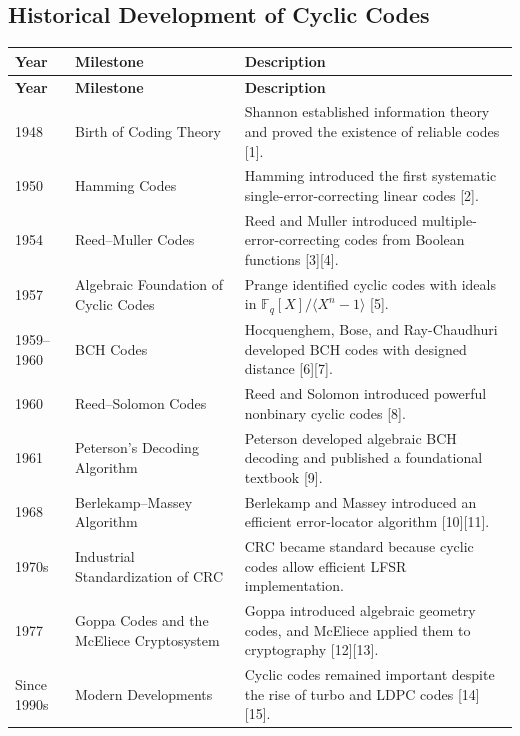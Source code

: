 \subsection{Historical Development of Cyclic Codes}
\label{historical-development-of-cyclic-codes}
\begin{longtable}{@{}p{2.25cm}|p{4cm}|>{\raggedright\arraybackslash}p{9.4cm}@{}}
	\toprule
	\textbf{Year} & \textbf{Milestone} & \textbf{Description} \\
	\midrule
	\endfirsthead
	
	\toprule
	\textbf{Year} & \textbf{Milestone} & \textbf{Description} \\
	\midrule
	\endhead
	
	\bottomrule
	\endfoot
	
	1948
	& Birth of Coding Theory
	& Shannon established information theory and proved the existence of reliable codes {[}1{]}. \\
	
	1950
	& Hamming Codes
	& Hamming introduced the first systematic single-error-correcting linear codes {[}2{]}. \\
	
	1954
	& Reed--Muller Codes
	& Reed and Muller introduced multiple-error-correcting codes from Boolean functions {[}3{]}{[}4{]}. \\
	
	1957
	& Algebraic Foundation of Cyclic Codes
	& Prange identified cyclic codes with ideals in \(\mathbb{F}_q[X]/\langle X^n-1\rangle\) {[}5{]}. \\
	
	1959--1960
	& BCH Codes
	& Hocquenghem, Bose, and Ray-Chaudhuri developed BCH codes with designed distance {[}6{]}{[}7{]}. \\
	
	1960
	& Reed--Solomon Codes
	& Reed and Solomon introduced powerful nonbinary cyclic codes {[}8{]}. \\
	
	1961
	& Peterson's Decoding Algorithm
	& Peterson developed algebraic BCH decoding and published a foundational textbook {[}9{]}. \\
	
	1968
	& Berlekamp--Massey Algorithm
	& Berlekamp and Massey introduced an efficient error-locator algorithm {[}10{]}{[}11{]}. \\
	
	1970s
	& Industrial Standardization of CRC
	& CRC became standard because cyclic codes allow efficient LFSR implementation. \\
	
	1977
	& Goppa Codes and the McEliece Cryptosystem
	& Goppa introduced algebraic geometry codes, and McEliece applied them to cryptography {[}12{]}{[}13{]}. \\
	
	Since 1990s
	& Modern Developments
	& Cyclic codes remained important despite the rise of turbo and LDPC codes {[}14{]}{[}15{]}. \\
	
\end{longtable}

